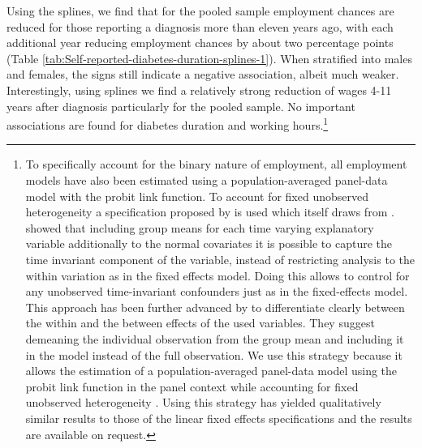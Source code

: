 Using the splines, we find that for the pooled sample employment chances
are reduced for those reporting a diagnosis more than eleven years
ago, with each additional year reducing employment chances by about
two percentage points (Table \ref{tab:Self-reported-diabetes-duration-splines-1}).
When stratified into males and females, the signs still indicate a
negative association, albeit much weaker. Interestingly, using splines
we find a relatively strong reduction of wages 4-11 years after diagnosis
particularly for the pooled sample. No important associations are
found for diabetes duration and working hours.\footnote{To specifically account for the binary nature of employment, all employment
models have also been estimated using a population-averaged panel-data
model with the probit link function. To account for fixed unobserved
heterogeneity a specification proposed by \citet{Bell2015} is used
which itself draws from \citet{Mundlak1978}. \citet{Mundlak1978}
showed that including group means for each time varying explanatory
variable additionally to the normal covariates it is possible to capture
the time invariant component of the variable, instead of restricting
analysis to the within variation as in the fixed effects model. Doing
this allows to control for any unobserved time-invariant confounders
just as in the fixed-effects model. This approach has been further
advanced by \citet{Bell2015} to differentiate clearly between the
within and the between effects of the used variables. They suggest
demeaning the individual observation from the group mean and including
it in the model instead of the full observation. We use this strategy
because it allows the estimation of a population-averaged panel-data
model using the probit link function in the panel context while accounting
for fixed unobserved heterogeneity \citep{Dieleman2014}. Using this
strategy has yielded qualitatively similar results to those of the
linear fixed effects specifications and the results are available
on request.}

